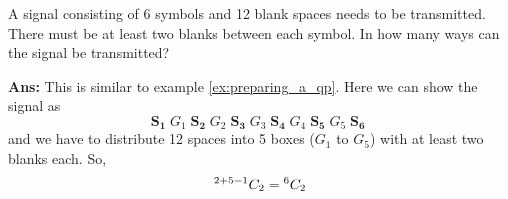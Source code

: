 \begin{example}
    A signal consisting of 6 symbols and 12 blank spaces needs to be transmitted. There must be at least two blanks between each symbol. In how many ways can the signal be transmitted?

    \textbf{Ans:} This is similar to example \ref{ex:preparing_a_qp}. Here we can show the signal as
    \[
        \mathbf{S_1}\; G_1 \;\mathbf{S_2}\;G_2\;\mathbf{S_3}\;G_3\;\mathbf{S_4}\;G_4\;\mathbf{S_5}\;G_5\;\mathbf{S_6}\;
    \]
    and we have to distribute 12 spaces into 5 boxes (\mbox{$G_1$} to \mbox{$G_5$}) with at least two blanks each. So,
    \[
        {}^{2+5-1}C_{2} = {}^{6}C_{2}
    \]
\end{example}

\begin{case study}
\end{case study}
